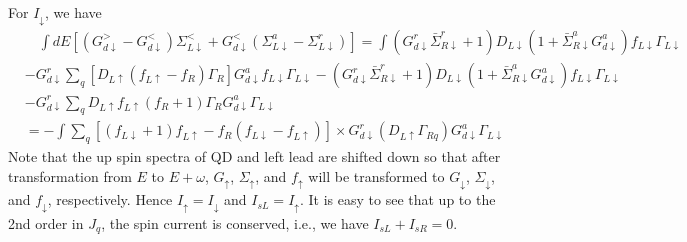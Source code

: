 \documentclass[aps,prb,superscriptaddress]{revtex4-2}
\begin{document}
For $I_\downarrow$, we have
\begin{equation}
\begin{split}
&\quad\int dE [(G_{d\downarrow}^>-G_{d\downarrow}^< )\Sigma_{L\downarrow}^< +G_{d\downarrow}^< (\Sigma_{L\downarrow}^a-\Sigma_{L\downarrow}^r)]= \int (G^r_{d\downarrow}{\bar \Sigma}_{R\downarrow}^r+1) D_{L\downarrow} (1+{\bar \Sigma}_{R\downarrow}^a G^a_{d\downarrow})f_{L\downarrow}\Gamma_{L\downarrow} \\
&- G^r_{d\downarrow} \sum_q [D_{L\uparrow}(f_{L\uparrow}-f_{R})\Gamma_{R}] G^a_{d\downarrow} f_{L\downarrow}\Gamma_{L\downarrow} - (G^r_{d\downarrow}{\bar \Sigma}_{R\downarrow}^r+1) D_{L\downarrow} (1+{\bar \Sigma}_{R\downarrow}^a G^a_{d\downarrow}) f_{L\downarrow}\Gamma_{L\downarrow} \\
&- G^r_{d\downarrow} \sum_q D_{L\uparrow}f_{L\uparrow}(f_R+1)\Gamma_R G^a_{d\downarrow} \Gamma_{L\downarrow} \\
& =-\int\sum_q [(f_{L\downarrow}+1)f_{L\uparrow} - f_R(f_{L\downarrow}-f_{L\uparrow})] \times G^r_{d\downarrow} (D_{L\uparrow} \Gamma_{Rq}) G^a_{d\downarrow}\Gamma_{L\downarrow} 
\end{split}
\end{equation}
Note that the up spin spectra of QD and left lead are shifted down so that after transformation from $E$ to $E+\omega$, $G_\uparrow$, $\Sigma_\uparrow$, and $f_\uparrow$ will be transformed to $G_\downarrow$, $\Sigma_\downarrow$, and $f_\downarrow$, respectively. Hence $I_\uparrow = I_\downarrow$ and $I_{sL} = I_\uparrow$. It is easy to see that up to the 2nd order in $J_q$, the spin current is conserved, i.e., we have $I_{sL} + I_{sR}=0$.
\end{document}
